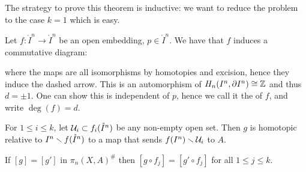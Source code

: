 \label{fig:HAT1}\medskip

\label{fig:HAT2}\medskip
The strategy to prove this theorem is inductive: we want to reduce the problem to the case $k=1$ which is easy.

\begin{definition}
Let $f:\ring I^n\to\ring I^n $ be an open embedding, $p\in\ring I^n$. We have that $f$ induces a commutative diagram:
\begin{center}
\end{center}
\end{definition}
where the maps are all isomorphisms by homotopies and excision, hence they induce the dashed arrow. This is an automorphism of $H_n(I^n,\partial I^n)\cong{\mathbb Z}$ and thus $d=\pm1$. One can show this is independent of $p$, hence we call it the  of $f$, and write $\deg(f)=d$.

\begin{lemma}
For $1\leq i\leq k$, let $\mathcal{U}_i\subset f_i(\mathring I^n)$ be any non-empty open set. Then $g$ is homotopic relative to $I^n\smallsetminus f(\mathring{I}^n)$ to a map that sends $f(I^n)\smallsetminus\mathcal{U}_i$ to $A$.
\end{lemma}

\begin{remark}
If $[g]=[g']$ in $\pi_n(X,A)^\#$ then $[g\circ f_j]=[g'\circ f_j]$ for all $1\leq j\leq k$.
\end{remark}

